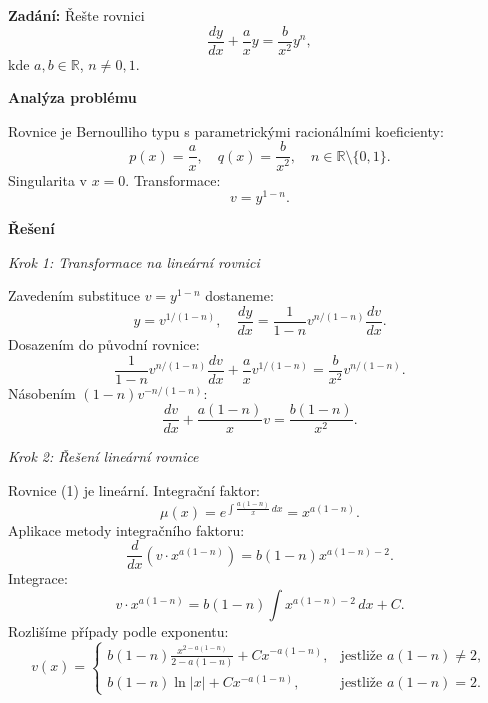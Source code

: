     \begin{example}
    \label{ex:a3-slozity-parametricke}
    
    \noindent\textbf{Zadání:} Řešte rovnici
    \[
    \frac{dy}{dx} + \frac{a}{x}y = \frac{b}{x^2} y^n,
    \]
    kde $a, b \in \mathbb{R}$, $n \neq 0, 1$.
    
    \vspace{1.5\baselineskip}
    
    \noindent\textbf{Analýza problému}
    
    \noindent Rovnice je Bernoulliho typu s parametrickými racionálními koeficienty:
    \[
    p(x) = \frac{a}{x}, \quad q(x) = \frac{b}{x^2}, \quad n \in \mathbb{R} \setminus \{0, 1\}.
    \]
    Singularita v $x = 0$. Transformace:
    \[
    v = y^{1-n}.
    \]
    
    \vspace{1.5\baselineskip}
    
    \noindent\textbf{Řešení}
    
    \noindent\textit{Krok 1: Transformace na lineární rovnici}
    
    Zavedením substituce $v = y^{1-n}$ dostaneme:
    \[
    y = v^{1/(1-n)}, \quad \frac{dy}{dx} = \frac{1}{1-n}v^{n/(1-n)}\frac{dv}{dx}.
    \]
    Dosazením do původní rovnice:
    \[
    \frac{1}{1-n}v^{n/(1-n)}\frac{dv}{dx} + \frac{a}{x}v^{1/(1-n)} = \frac{b}{x^2} v^{n/(1-n)}.
    \]
    Násobením $(1-n)v^{-n/(1-n)}$:
    \[
    \frac{dv}{dx} + \frac{a(1-n)}{x}v = \frac{b(1-n)}{x^2}. \tag{1}
    \]
    
    \vspace{1\baselineskip}
    
    \noindent\textit{Krok 2: Řešení lineární rovnice}
    
    Rovnice (1) je lineární. Integrační faktor:
    \[
    \mu(x) = e^{\int \frac{a(1-n)}{x}\,dx} = x^{a(1-n)}.
    \]
    Aplikace metody integračního faktoru:
    \[
    \frac{d}{dx}(v \cdot x^{a(1-n)}) = b(1-n)x^{a(1-n)-2}.
    \]
    Integrace:
    \[
    v \cdot x^{a(1-n)} = b(1-n) \int x^{a(1-n)-2}\,dx + C.
    \]
    Rozlišíme případy podle exponentu:
    \[
    v(x) = 
    \begin{cases}
    b(1-n)\frac{x^{2-a(1-n)}}{2 - a(1-n)} + Cx^{-a(1-n)}, & \text{jestliže } a(1-n) \neq 2, \\
    b(1-n)\ln|x| + Cx^{-a(1-n)}, & \text{jestliže } a(1-n) = 2.
    \end{cases} \tag{2}
    \]
    

\end{example}
